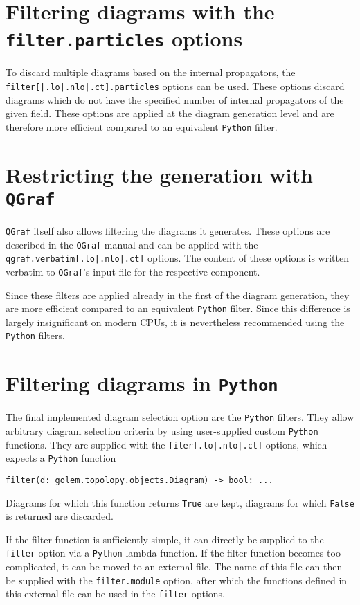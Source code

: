 \documentclass[11pt,a4paper]{refrep}
\newcommand{\qgraf}{{\tt QGraf}\xspace}
\newcommand{\python}{{\tt Python}\xspace}
\begin{document}
\section{Filtering diagrams with the \texttt{filter.particles} options}
To discard multiple diagrams based on the internal propagators, the \texttt{filter[|.lo|.nlo|.ct].particles} options can be used. These options discard diagrams which do not have the specified number of internal propagators of the given field. These options are applied at the diagram generation level and are therefore more efficient compared to an equivalent \python filter.

\section{Restricting the generation with \qgraf}
\qgraf itself also allows filtering the diagrams it generates. These options are described in the \qgraf manual and can be applied with the \texttt{qgraf.verbatim[.lo|.nlo|.ct]} options. The content of these options is written verbatim to \qgraf's input file for the respective component. 

Since these filters are applied already in the first of the diagram generation, they are more efficient compared to an equivalent \python filter. Since this difference is largely insignificant on modern CPUs, it is nevertheless recommended using the \python filters.

\section{Filtering diagrams in \python{}}
\label{sec:filter}
The final implemented diagram selection option are the \python filters. They allow arbitrary diagram selection criteria by using user-supplied custom \python functions. They are supplied with the \texttt{filer[.lo|.nlo|.ct]} options, which expects a \python function \begin{lstlisting}[style=py]
   filter(d: golem.topolopy.objects.Diagram) -> bool: ...
\end{lstlisting}
Diagrams for which this function returns \texttt{True} are kept, diagrams for which \texttt{False} is returned are discarded.

If the filter function is sufficiently simple, it can directly be supplied to the \texttt{filter} option via a \python lambda-function. If the filter function becomes too complicated, it can be moved to an external file. The name of this file can then be supplied with the \texttt{filter.module} option, after which the functions defined in this external file can be used in the \texttt{filter} options.
\end{document}
